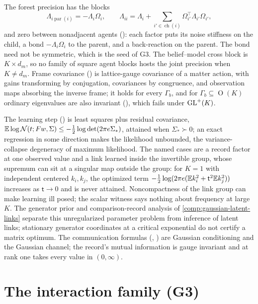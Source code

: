 The forest precision has the blocks
\[
\Lambda_{i\operatorname{par}(i)}=-\Lambda_i\Omega_i,
\qquad
\Lambda_{ii}=\Lambda_i+\sum_{i'\in\operatorname{ch}(i)}\Omega_{i'}^\top\Lambda_{i'}\Omega_{i'},
\]
and zero between nonadjacent agents (): each factor puts its
noise stiffness on the child, a bond \(-\Lambda_i\Omega_i\) to the parent, and a back-reaction on the
parent. The bond need not be symmetric, which is the seed of G3. The belief--model cross block is
\(K\times d_m\), so no family of square agent blocks hosts the joint precision when \(K\neq d_m\).
Frame covariance () is lattice-gauge covariance of a matter action,
with gains transforming by conjugation, covariances by congruence, and observation maps absorbing the
inverse frame; it holds for every \(\Gamma_b\), and for \(\Gamma_b\subseteq\operatorname{O}(K)\) ordinary
eigenvalues are also invariant (), which fails under \(\mathrm{GL}^+(K)\).

The learning step () is least squares plus residual covariance,
\(\mathbb E\log\mathcal N(t;Fw,\Sigma)\leq-\tfrac12\log\det(2\pi e\Sigma_*)\), attained when
\(\Sigma_*\succ0\); an exact regression in some direction makes the likelihood unbounded, the
variance-collapse degeneracy of maximum likelihood. The named cases are a record factor at one observed
value and a link learned inside the invertible group, whose supremum can sit at a singular map outside
the group: for \(K=1\) with independent centered \(k_i,k_j\), the optimized term
\(-\tfrac12\log(2\pi e(\mathbb E k_i^2+\mathsf t^2\mathbb E k_j^2))\) increases as \(\mathsf t\to0\) and is never
attained. Noncompactness of the link group can make learning ill posed; the scalar witness says nothing
about frequency at large \(K\). The generator prior and comparison-record analysis of
\cref{comp:gaussian-latent-links} separate this unregularized parameter problem from inference of
latent links; stationary generator coordinates at a critical exponential do not certify a matrix
optimum. The communication formulas (,
) are Gaussian conditioning and the Gaussian channel; the record's
mutual information is gauge invariant and at rank one takes every value in \((0,\infty)\).

\section{The interaction family (G3)}
\label{comp:sg1-interaction}


